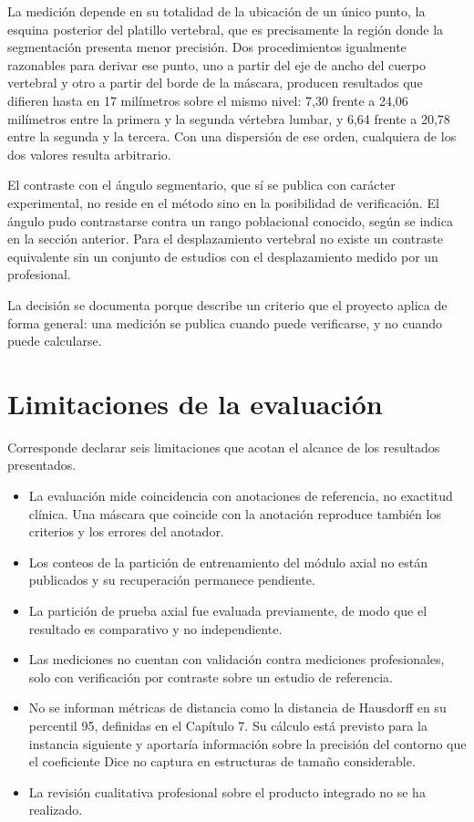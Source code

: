 La medición depende en su totalidad de la ubicación de un único punto, la esquina posterior del platillo vertebral, que es precisamente la región donde la segmentación presenta menor precisión. Dos procedimientos igualmente razonables para derivar ese punto, uno a partir del eje de ancho del cuerpo vertebral y otro a partir del borde de la máscara, producen resultados que difieren hasta en 17 milímetros sobre el mismo nivel: 7,30 frente a 24,06 milímetros entre la primera y la segunda vértebra lumbar, y 6,64 frente a 20,78 entre la segunda y la tercera. Con una dispersión de ese orden, cualquiera de los dos valores resulta arbitrario.

El contraste con el ángulo segmentario, que sí se publica con carácter experimental, no reside en el método sino en la posibilidad de verificación. El ángulo pudo contrastarse contra un rango poblacional conocido, según se indica en la sección anterior. Para el desplazamiento vertebral no existe un contraste equivalente sin un conjunto de estudios con el desplazamiento medido por un profesional.

La decisión se documenta porque describe un criterio que el proyecto aplica de forma general: una medición se publica cuando puede verificarse, y no cuando puede calcularse.

\section{Limitaciones de la evaluación}

Corresponde declarar seis limitaciones que acotan el alcance de los resultados presentados.

\begin{itemize}
\item La evaluación mide coincidencia con anotaciones de referencia, no exactitud clínica. Una máscara que coincide con la anotación reproduce también los criterios y los errores del anotador.
\item Los conteos de la partición de entrenamiento del módulo axial no están publicados y su recuperación permanece pendiente.
\item La partición de prueba axial fue evaluada previamente, de modo que el resultado es comparativo y no independiente.
\item Las mediciones no cuentan con validación contra mediciones profesionales, solo con verificación por contraste sobre un estudio de referencia.
\item No se informan métricas de distancia como la distancia de Hausdorff en su percentil 95, definidas en el Capítulo 7. Su cálculo está previsto para la instancia siguiente y aportaría información sobre la precisión del contorno que el coeficiente Dice no captura en estructuras de tamaño considerable.
\item La revisión cualitativa profesional sobre el producto integrado no se ha realizado.
\end{itemize}

